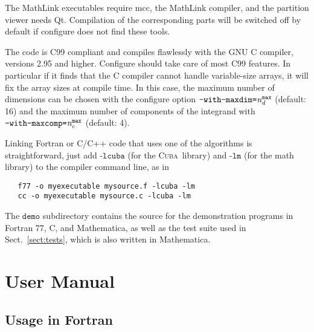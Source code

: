 \documentclass[12pt]{article}
\newcommand\cuba{\textsc{Cuba}}
\newcommand\Code[1]{\ensuremath{\texttt{#1}}}
\newcommand\Var[1]{\ensuremath{\mathit{#1}}}
\begin{document}
The MathLink executables require mcc, the MathLink compiler, and the
partition viewer needs Qt.  Compilation of the corresponding parts will
be switched off by default if configure does not find these tools.

The code is C99 compliant and compiles flawlessly with the GNU C
compiler, versions 2.95 and higher.  Configure should take care of most
C99 features.  In particular if it finds that the C compiler cannot
handle variable-size arrays, it will fix the array sizes at compile
time.  In this case, the maximum number of dimensions can be chosen with
the configure option \Code{--with-maxdim=\Var{n_d^{\text{max}}}}
(default: 16) and the maximum number of components of the integrand with
\Code{--with-maxcomp=\Var{n_c^{\text{max}}}} (default: 4).

Linking Fortran or C/C++ code that uses one of the algorithms is
straightforward, just add \Code{-lcuba} (for the \cuba\ library) and
\Code{-lm} (for the math library) to the compiler command line, as in
\begin{verbatim}
   f77 -o myexecutable mysource.f -lcuba -lm
   cc -o myexecutable mysource.c -lcuba -lm
\end{verbatim}
The \Code{demo} subdirectory contains the source for the demonstration
programs in Fortran 77, C, and Mathematica, as well as the test suite
used in Sect.\ \ref{sect:tests}, which is also written in Mathematica.


\section{User Manual}

\subsection{Usage in Fortran}
\end{document}
